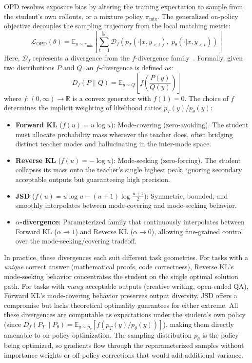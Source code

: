 \documentclass{article} %
\newcommand{\E}{\mathbb{E}}
\newcommand{\ptheta}{p_\theta}
\newcommand{\pteacher}{p_T}
\newcommand{\loss}{\mathcal{L}}
\begin{document}
OPD resolves exposure bias by altering the training expectation to sample from the student's own rollouts, or a mixture policy $\pi_{\mathrm{mix}}$. The generalized on-policy objective decouples the sampling trajectory from the local matching metric:
\begin{equation}
    \loss_{\mathrm{OPD}}(\theta) = \E_{y \sim \pi_{\mathrm{mix}}} \left[ \sum_{t=1}^{|y|} \mathcal{D}_f \left( \pteacher(\cdot | x, y_{<t}),\; \ptheta(\cdot | x, y_{<t}) \right) \right]
\end{equation}
Here, $\mathcal{D}_f$ represents a divergence from the $f$-divergence family~\citep{2307.15190}. Formally, given two distributions $P$ and $Q$, an $f$-divergence is defined as:
\begin{equation}
    D_f(P \parallel Q) = \E_{y \sim Q}\left[f\!\left(\frac{P(y)}{Q(y)}\right)\right]
\end{equation}
where $f: (0,\infty) \to \mathbb{R}$ is a convex generator with $f(1) = 0$. The choice of $f$ determines the implicit weighting of likelihood ratios $\pteacher(y)/\ptheta(y)$:

\begin{itemize}[nosep]
    \item \textbf{Forward KL} ($f(u) = u \log u$): Mode-covering (zero-avoiding). The student must allocate probability mass wherever the teacher does, often bridging distinct teacher modes and hallucinating in the inter-mode space.
    \item \textbf{Reverse KL} ($f(u) = -\log u$): Mode-seeking (zero-forcing). The student collapses its mass onto the teacher's single highest peak, ignoring secondary acceptable outputs but guaranteeing high precision.
    \item \textbf{JSD} ($f(u) = u\log u - (u+1)\log\frac{u+1}{2}$): Symmetric, bounded, and smoothly interpolates between mode-covering and mode-seeking behavior.
    \item \textbf{$\alpha$-divergence}: Parameterized family that continuously interpolates between Forward KL ($\alpha \to 1$) and Reverse KL ($\alpha \to 0$), allowing fine-grained control over the mode-seeking/covering tradeoff.
\end{itemize}

In practice, these divergences each suit different task geometries. For tasks with a \emph{unique} correct answer (mathematical proofs, code correctness), Reverse KL's mode-seeking behavior concentrates the student on the single optimal solution path. For tasks with \emph{many} acceptable outputs (creative writing, open-ended QA), Forward KL's mode-covering behavior preserves output diversity. JSD offers a compromise but lacks theoretical optimality guarantees for either extreme. All these divergences are computable as expectations under the student's own policy (since $D_f(P_T \parallel P_\theta) = \E_{y \sim \ptheta}[f(\pteacher(y)/\ptheta(y))]$), making them directly amenable to on-policy optimization. The sampling distribution $\ptheta$ is the policy being optimized, so gradients flow through the reparameterized samples without importance weights or off-policy corrections that would add additional variance.
\end{document}
